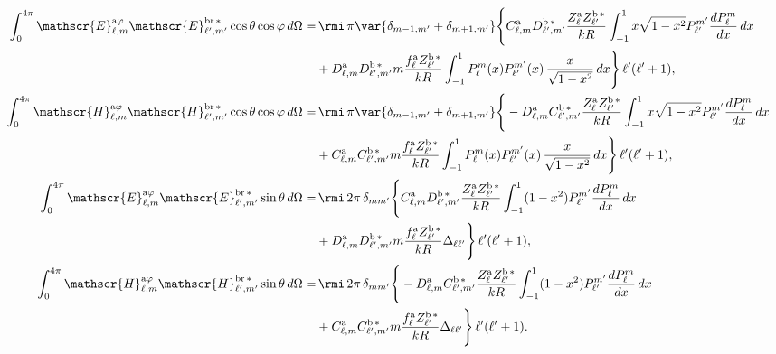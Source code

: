 \vspace{-0.8cm}
\begin{align}
%
%
\int_0^{4\pi}\mathscr{E}_{\ell, m}^{\text{a}\varphi}\mathscr{E}_{\ell^{\prime}, m^{\prime}}^{\text{br}\,*}\cos\theta\cos\varphi \, d\Omega
%
 =& \, \rmi \, \pi \var{ \delta_{m-1, m^{\prime}} + \delta_{m+1, m^{\prime}} } \Bigg\{ C_{\ell, m}^{\rm a} D_{\ell^{\prime}, m^{\prime}}^{\rm b \, *} \frac{Z_{\ell}^{\rm a} Z_{\ell^{\prime}}^{\rm b \, *}}{k R} \int_{-1}^1 x \sqrt{1-x^2} P_{\ell^{\prime}}^{m^{\prime}} \frac{dP_{\ell}^m}{dx} \,dx \nonumber \\ &
%
 + D_{\ell, m}^{\rm a} D_{\ell^{\prime}, m^{\prime}}^{\rm b \, *} m \frac{f_{\ell}^{\rm a} Z_{\ell^{\prime}}^{\rm b\, *}}{k R} \int_{-1}^1 P_{\ell}^{m}(x) P_{\ell^{\prime}}^{m^{\prime}}(x) \, \frac{x}{\sqrt{1-x^2}} \, dx \Bigg\}\, \ell^{\prime}(\ell^{\prime}+1),\\
%
%
\int_0^{4\pi}\mathscr{H}_{\ell, m}^{\text{a}\varphi}\mathscr{H}_{\ell^{\prime}, m^{\prime}}^{\text{br}\,*}\cos\theta\cos\varphi \, d\Omega
%
 =& \, \rmi \, \pi \var{ \delta_{m-1, m^{\prime}} + \delta_{m+1, m^{\prime}} } \Bigg\{ -D_{\ell, m}^{\rm a} C_{\ell^{\prime}, m^{\prime}}^{\rm b \, *} \frac{Z_{\ell}^{\rm a} Z_{\ell^{\prime}}^{\rm b \, *}}{k R} \int_{-1}^1 x \sqrt{1-x^2} P_{\ell^{\prime}}^{m^{\prime}} \frac{dP_{\ell}^m}{dx} \,dx \nonumber \\ &
%
 + C_{\ell, m}^{\rm a} C_{\ell^{\prime}, m^{\prime}}^{\rm b \, *} m \frac{f_{\ell}^{\rm a} Z_{\ell^{\prime}}^{\rm b\, *}}{k R} \int_{-1}^1 P_{\ell}^{m}(x) P_{\ell^{\prime}}^{m^{\prime}}(x) \, \frac{x}{\sqrt{1-x^2}} \, dx \Bigg\}\, \ell^{\prime}(\ell^{\prime}+1),\\
% 
%
%
%
\int_0^{4\pi}\mathscr{E}_{\ell, m}^{\text{a}\varphi}\mathscr{E}_{\ell^{\prime}, m^{\prime}}^{\text{br}\,*}\sin\theta \, d\Omega
%
 =& \, \rmi \, 2\pi \, \delta_{m m^{\prime}} \Bigg\{ C_{\ell, m}^{\rm a} D_{\ell^{\prime}, m^{\prime}}^{\rm b \, *} \frac{Z_{\ell}^{\rm a} Z_{\ell^{\prime}}^{\rm b \, *}}{k R} \int_{-1}^{1} (1-x^2) P_{\ell^{\prime}}^{m^{\prime}} \frac{dP_{\ell}^m}{dx} \, dx \nonumber \\ &
%
+ D_{\ell, m}^{\rm a} D_{\ell^{\prime}, m^{\prime}}^{\rm b \, *} m \frac{f_{\ell}^{\rm a} Z_{\ell^{\prime}}^{\rm b\, *}}{k R} \Delta_{\ell \ell^{\prime}} \Bigg\} \, \ell^{\prime}(\ell^{\prime}+1),\\
%
%
\int_0^{4\pi}\mathscr{H}_{\ell, m}^{\text{a}\varphi}\mathscr{H}_{\ell^{\prime}, m^{\prime}}^{\text{br}\,*}\sin\theta \, d\Omega
%
 =& \, \rmi \, 2\pi \, \delta_{m m^{\prime}} \Bigg\{ -D_{\ell, m}^{\rm a} C_{\ell^{\prime}, m^{\prime}}^{\rm b \, *} \frac{Z_{\ell}^{\rm a} Z_{\ell^{\prime}}^{\rm b \, *}}{k R} \int_{-1}^{1} (1-x^2) P_{\ell^{\prime}}^{m^{\prime}} \frac{dP_{\ell}^m}{dx} \, dx \nonumber \\ &
%
+ C_{\ell, m}^{\rm a} C_{\ell^{\prime}, m^{\prime}}^{\rm b \, *} m \frac{f_{\ell}^{\rm a} Z_{\ell^{\prime}}^{\rm b\, *}}{k R} \Delta_{\ell \ell^{\prime}} \Bigg\} \, \ell^{\prime}(\ell^{\prime}+1).
\end{align}
